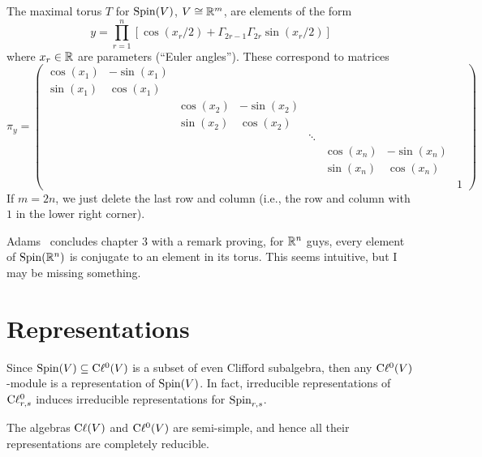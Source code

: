 The maximal torus $T$ for $\operatorname{Spin}(V)$, $V\cong\mathbb{R}^{m}$, are elements of
the form
\begin{equation}
y = \prod^{n}_{r=1}[\cos(x_{r}/2) + \Gamma_{2r-1}\Gamma_{2r}\sin(x_{r}/2)]
\end{equation}
where $x_{r}\in\mathbb{R}$ are parameters (``Euler angles''). These correspond
to matrices
\begin{equation}
  \pi_{y} = 
\begin{pmatrix}
\cos(x_{1}) & -\sin(x_{1}) &            &              & & & & \\
\sin(x_{1}) &  \cos(x_{1}) &            &              & & & & \\
           &              & \cos(x_{2}) & -\sin(x_{2}) & & & & \\
           &              & \sin(x_{2}) &  \cos(x_{2}) & & & & \\
 & & & & \ddots &            &              & \\
 & & & &        & \cos(x_{n}) & -\sin(x_{n}) & \\
 & & & &        & \sin(x_{n}) &  \cos(x_{n}) &  \\
 & & & &        &             &             & 1
\end{pmatrix}
\end{equation}
If $m=2n$, we just delete the last row and column (i.e., the row and
column with $1$ in the lower right corner).

\begin{remark}
Adams~\cite{adams1996:ex} concludes chapter 3 with a remark proving, for
$\mathbb{R}^{n}$ guys, every element of $\operatorname{Spin}(\mathbb{R}^{n})$ is conjugate to an
element in its torus. This seems intuitive, but I may be missing
something. 
\end{remark}

\section{Representations}

\M
Since $\operatorname{Spin}(V)\subseteq\mathrm{C}\ell^{0}(V)$ is a subset of even Clifford
subalgebra, then any $\mathrm{C}\ell^{0}(V)$-module is a representation of
$\operatorname{Spin}(V)$. In fact, irreducible representations of $\mathrm{C}\ell_{r,s}^{0}$ 
induces irreducible representations for $\operatorname{Spin}_{r,s}$.

\begin{proposition}
The algebras $\mathrm{C}\ell(V)$ and $\mathrm{C}\ell^{0}(V)$ are semi-simple, and hence all
their representations are completely reducible.
\end{proposition}

